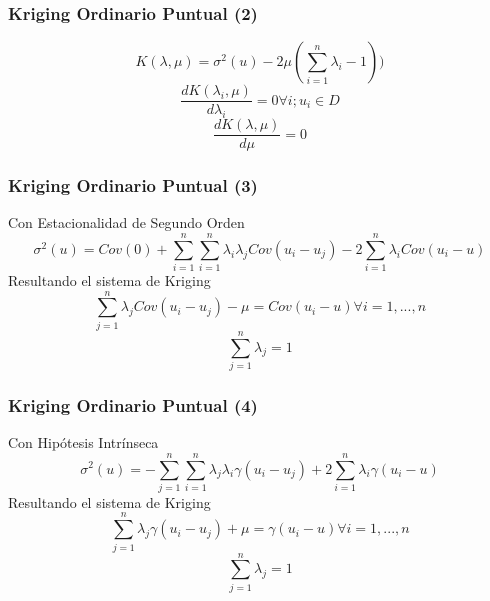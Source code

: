 \documentclass{beamer}
\begin{document}
\begin{frame}
\frametitle{Kriging Ordinario Puntual (2)}
\begin{equation}
K(\lambda, \mu) = \sigma^2(u) - 2 \mu(\sum_{i=1}^n\lambda_i - 1))
\end{equation}
\begin{equation}
\frac{dK(\lambda_i, \mu)}{d\lambda_i} = 0 \forall i; u_i \in D
\end{equation}
\begin{equation}
\frac{dK(\lambda, \mu)}{d\mu} = 0
\end{equation}
\end{frame}

\begin{frame}
\frametitle{Kriging Ordinario Puntual (3)}
Con Estacionalidad de Segundo Orden
\begin{equation}
\sigma^2(u) = Cov(0) + \sum_{i=1}^n \sum_{i=1}^n \lambda_i \lambda_j Cov(u_i-u_j) - 2 \sum_{i=1}^n \lambda_i Cov(u_i-u)
\end{equation}
Resultando el sistema de Kriging
\begin{equation}
\sum_{j=1}^n \lambda_j Cov(u_i - u_j) - \mu = Cov(u_i - u) \forall i = 1,...,n
\end{equation}
\begin{equation}
\sum_{j=1}^n \lambda_j = 1
\end{equation}
\end{frame}

\begin{frame}
\frametitle{Kriging Ordinario Puntual (4)}
Con Hipótesis Intrínseca
\begin{equation}
\sigma^2(u) = -\sum_{j=1}^n\sum_{i=1}^n \lambda_j\lambda_i \gamma(u_i - u_j) + 2 \sum_{i=1}^n \lambda_i \gamma(u_i - u)
\end{equation}
Resultando el sistema de Kriging
\begin{equation}
\sum_{j=1}^n \lambda_j \gamma(u_i - u_j) + \mu = \gamma(u_i - u) \forall i = 1,...,n
\end{equation}
\begin{equation}
\sum_{j=1}^n \lambda_j = 1
\end{equation}
\end{frame}
\end{document}
